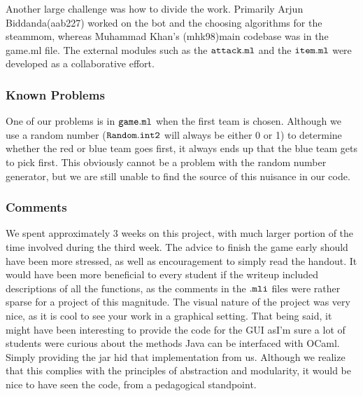 \documentclass[10pt]{article}
\begin{document}
Another large challenge was how to divide the work. Primarily Arjun Biddanda(aab227) worked on the bot and the choosing algorithms for the steammom, whereas Muhammad Khan's (mhk98)main codebase was in the game.ml file. The external modules such as the $\tt{attack.ml}$ and the $\tt{item.ml}$ were developed as a collaborative effort.

\subsubsection*{Known Problems}

One of our problems is in $\tt{game.ml}$ when the first team is chosen. Although we use a random number ($\tt{Random.int 2}$ will always be either 0 or 1) to determine whether the red or blue team goes first, it always ends up that the blue team gets to pick first. This obviously cannot be a problem with the random number generator, but we are still unable to find the source of this nuisance in our code.








\subsubsection*{Comments}

We spent approximately 3 weeks on this project, with much larger portion of the time involved during the third week. The advice to finish the game early should have been more stressed, as well as encouragement to simply read the handout. It would have been more beneficial to every student if the writeup included descriptions of all the functions, as the comments in the $\tt{.mli}$ files were rather sparse for a project of this magnitude. The visual nature of the project was very nice, as it is cool to see your work in a graphical setting. That being said, it might have been interesting to provide the code for the GUI asI'm sure a lot of students were curious about the methods Java can be interfaced with OCaml. Simply providing the jar hid that implementation from us. Although we realize that this complies with the principles of abstraction and modularity, it would be nice to have seen the code, from a pedagogical standpoint.
\end{document}
